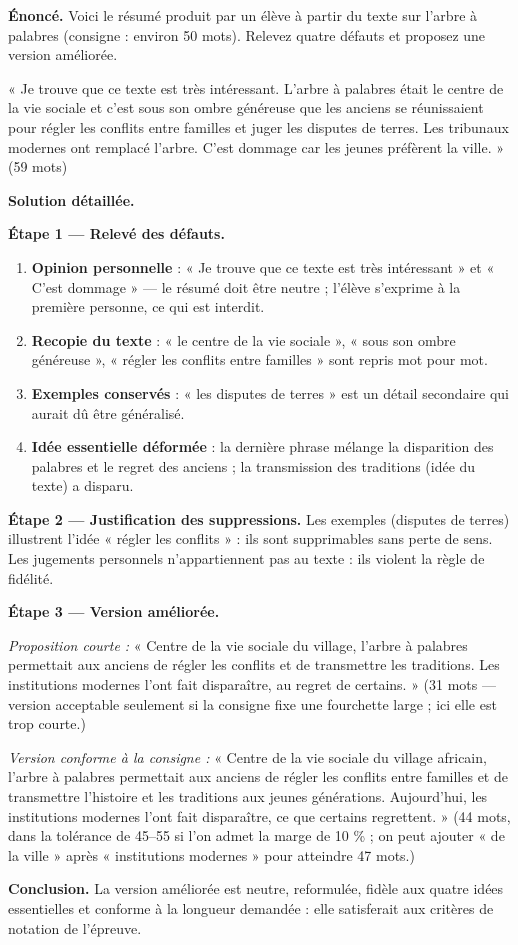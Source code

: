 \documentclass[11pt]{article}
\begin{document}
\begin{exoresolu}
\textbf{Énoncé.} Voici le résumé produit par un élève à partir du texte sur l'arbre à palabres (consigne : environ 50 mots). Relevez quatre défauts et proposez une version améliorée.

« Je trouve que ce texte est très intéressant. L'arbre à palabres était le centre de la vie sociale et c'est sous son ombre généreuse que les anciens se réunissaient pour régler les conflits entre familles et juger les disputes de terres. Les tribunaux modernes ont remplacé l'arbre. C'est dommage car les jeunes préfèrent la ville. » (59 mots)

\tcblower
\textbf{Solution détaillée.}

\textbf{Étape 1 — Relevé des défauts.}
\begin{enumerate}
\item \textbf{Opinion personnelle} : « Je trouve que ce texte est très intéressant » et « C'est dommage » — le résumé doit être neutre ; l'élève s'exprime à la première personne, ce qui est interdit.
\item \textbf{Recopie du texte} : « le centre de la vie sociale », « sous son ombre généreuse », « régler les conflits entre familles » sont repris mot pour mot.
\item \textbf{Exemples conservés} : « les disputes de terres » est un détail secondaire qui aurait dû être généralisé.
\item \textbf{Idée essentielle déformée} : la dernière phrase mélange la disparition des palabres et le regret des anciens ; la transmission des traditions (idée du texte) a disparu.
\end{enumerate}

\textbf{Étape 2 — Justification des suppressions.} Les exemples (disputes de terres) illustrent l'idée « régler les conflits » : ils sont supprimables sans perte de sens. Les jugements personnels n'appartiennent pas au texte : ils violent la règle de fidélité.

\textbf{Étape 3 — Version améliorée.}

\emph{Proposition courte :} « Centre de la vie sociale du village, l'arbre à palabres permettait aux anciens de régler les conflits et de transmettre les traditions. Les institutions modernes l'ont fait disparaître, au regret de certains. » (31 mots — version acceptable seulement si la consigne fixe une fourchette large ; ici elle est trop courte.)

\emph{Version conforme à la consigne :} « Centre de la vie sociale du village africain, l'arbre à palabres permettait aux anciens de régler les conflits entre familles et de transmettre l'histoire et les traditions aux jeunes générations. Aujourd'hui, les institutions modernes l'ont fait disparaître, ce que certains regrettent. » (44 mots, dans la tolérance de 45--55 si l'on admet la marge de 10 \% ; on peut ajouter « de la ville » après « institutions modernes » pour atteindre 47 mots.)

\textbf{Conclusion.} La version améliorée est neutre, reformulée, fidèle aux quatre idées essentielles et conforme à la longueur demandée : elle satisferait aux critères de notation de l'épreuve.
\end{exoresolu}
\end{document}
